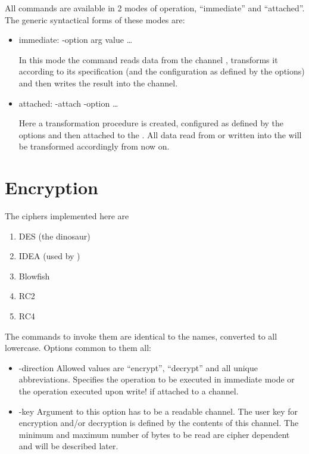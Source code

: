 \documentclass {report}
\begin{document}
All commands are available in 2 modes of operation, ``immediate'' and
``attached''. The generic syntactical forms of these modes are:

\begin {itemize}
\item[immediate:]	 -option arg {value} \dots{}  

			In this mode the command reads data from the
			channel , transforms it according
			to its specification (and the configuration as
			defined by the options) and then writes the
			result into the  channel.

\item[attached:]	 -attach  -option  \dots{}

			Here a transformation procedure is created,
			configured as defined by the options and then
			attached to the . All data read
			from or written into the  will
			be transformed accordingly from now on.
\end   {itemize}


\section {Encryption}

The ciphers implemented here are

\begin {enumerate}
\item	DES 	(the dinosaur)
\item	IDEA	(used by \PGP)
\item	Blowfish
\item	RC2
\item	RC4
\end   {enumerate}

The commands to invoke them are identical to the names, converted to
all lowercase. Options common to them all:

\begin {itemize}
\item [-direction]	Allowed values are ``encrypt'', ``decrypt'' and all
			unique abbreviations. Specifies the operation
			to be executed in immediate mode or the
			operation executed upon write! if attached to
			a channel.
\item [-key]		Argument to this option has to be a readable
			channel. The user key for encryption and/or
			decryption is defined by the contents of this
			channel. The minimum and maximum number of
			bytes to be read are cipher dependent and will
			be described later.
\end   {itemize}
\end{document}
